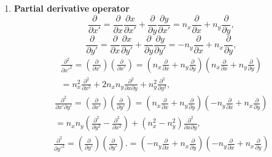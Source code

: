 \documentclass[review]{elsarticle}
\begin{document}
\begin{enumerate}
	\item \textbf{Partial derivative operator}
	\begin{equation}\label{TPartialx}
		\frac{\partial}{\partial x'}=\frac{\partial}{\partial x}\frac{\partial x}{\partial x'} 
		+\frac{\partial}{\partial y}\frac{\partial y}{\partial x'}=n_x\frac{\partial}{\partial x} 
		+n_y\frac{\partial}{\partial y},
	\end{equation}
	\begin{equation}\label{TPartialy}
		\frac{\partial}{\partial y'}=\frac{\partial}{\partial x}\frac{\partial x}{\partial y'} 
		+\frac{\partial}{\partial y}\frac{\partial y}{\partial y'}=-n_y\frac{\partial}{\partial x} 
		+n_x\frac{\partial}{\partial y},
	\end{equation}
	\begin{equation}\label{TPartialx2}
	\begin{gathered}
		\frac{\partial^2}{\partial x'^2}=\left(\frac{\partial}{\partial x'}\right)\left(\frac{\partial}{\partial x'}\right)
		=\left(	n_x\frac{\partial}{\partial x}+n_y\frac{\partial}{\partial y}\right)\left(	n_x\frac{\partial}{\partial x}+n_y\frac{\partial}{\partial y}\right)\\
		=n_x^2\frac{\partial^2}{\partial x^2}+2n_xn_y\frac{\partial^2}{\partial x\partial y}+n_y^2\frac{\partial^2}{\partial y^2},
	\end{gathered}
	\end{equation}
	\begin{equation}\label{TPartialxy}
	\begin{gathered}
		\frac{\partial^2}{\partial x'\partial y'}=\left(\frac{\partial}{\partial x'}\right)\left(\frac{\partial}{\partial y'}\right)
		=\left(	n_x\frac{\partial}{\partial x}+n_y\frac{\partial}{\partial y}\right)\left(	-n_y\frac{\partial}{\partial x}+n_x\frac{\partial}{\partial y}\right)\\
		=n_xn_y\left(\frac{\partial^2}{\partial y^2}-\frac{\partial^2}{\partial x^2}\right)
		+\left(n_x^2-n_y^2\right)\frac{\partial^2}{\partial x\partial y},
	\end{gathered}
	\end{equation}
	\begin{equation}\label{TPartialy2}
	\begin{gathered}
		\frac{\partial^2}{\partial y'^2}=\left(\frac{\partial}{\partial y'}\right)\left(\frac{\partial}{\partial y'}\right).
				=\left(	-n_y\frac{\partial}{\partial x}+n_x\frac{\partial}{\partial y}\right)\left(	-n_y\frac{\partial}{\partial x}+n_x\frac{\partial}{\partial y}\right)\\

\end{gathered}
\end{equation}
\end{enumerate}
\end{document}
